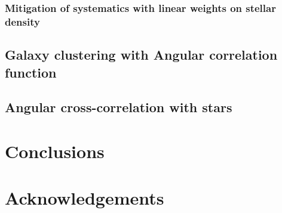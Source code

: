 \documentclass[fleqn,usenatbib]{mnras}
\newcommand{\mike}[1]{~\newline\noindent \textcolor{Green}{{ [Michael:~{#1}]\\}}}
\newcommand{\BGS}{\textsc{bgs}\xspace}
\newcommand{\GAMA}{\textsc{gama}\xspace}
\newcommand{\SDSS}{\textsc{sdss}\xspace}
\begin{document}
\subsubsection{Mitigation of systematics with linear weights on stellar density}
\subsection{Galaxy clustering with Angular correlation function}
\subsection{Angular cross-correlation with stars}

\section{Conclusions}

\section*{Acknowledgements}
\end{document}
